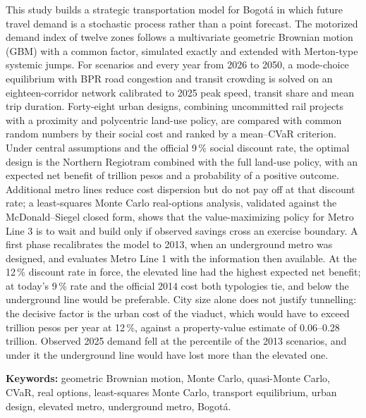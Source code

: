 This study builds a strategic transportation model for Bogotá in which future travel demand is a
stochastic process rather than a point forecast. The motorized demand index of twelve zones follows a
multivariate geometric Brownian motion (GBM) with a common factor, simulated exactly and extended with
Merton-type systemic jumps. For \NEscenarios{} scenarios and every year from 2026 to 2050, a
mode-choice equilibrium with BPR road congestion and transit crowding is solved on an eighteen-corridor
network calibrated to 2025 peak speed, transit share and mean trip duration. Forty-eight urban designs,
combining uncommitted rail projects with a proximity and polycentric land-use policy, are compared with
common random numbers by their social cost and ranked by a mean--CVaR criterion. Under central
assumptions and the official 9\,\% social discount rate, the optimal design is the Northern Regiotram
combined with the full land-use policy, with an expected net benefit of \BNOptimo{} trillion pesos and
a \PBNOptimo{} probability of a positive outcome. Additional metro lines reduce cost dispersion but do
not pay off at that discount rate; a least-squares Monte Carlo real-options analysis, validated against
the McDonald--Siegel closed form, shows that the value-maximizing policy for Metro Line 3 is to wait and
build only if observed savings cross an exercise boundary. A first phase recalibrates the model to
2013, when an underground metro was designed, and evaluates Metro Line 1 with the information then
available. At the 12\,\% discount rate in force, the elevated line had the highest expected net
benefit; at today's 9\,\% rate and the official 2014 cost both typologies tie, and below
\TasaEmpate{} the underground line would be preferable. City size alone does not justify tunnelling:
the decisive factor is the urban cost of the viaduct, which would have to exceed \UmbralOfDoce{}
trillion pesos per year at 12\,\%, against a property-value estimate of 0.06--0.28 trillion. Observed
2025 demand fell at the \PercentilObsFin{} percentile of the 2013 scenarios, and under it the
underground line would have lost more than the elevated one.

\medskip
\noindent\textbf{Keywords:} geometric Brownian motion, Monte Carlo, quasi-Monte Carlo, CVaR, real
options, least-squares Monte Carlo, transport equilibrium, urban design, elevated metro, underground metro, Bogotá.
